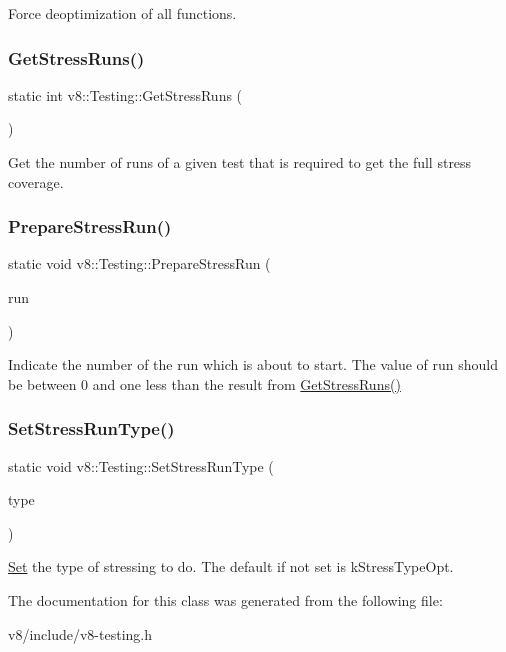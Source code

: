 Force deoptimization of all functions. \mbox{\label{classv8_1_1Testing_adc876063b1e07462b8d9544dd8efab36}} 
\subsubsection{\texorpdfstring{Get\+Stress\+Runs()}{GetStressRuns()}}
{\footnotesize\ttfamily static int v8\+::\+Testing\+::\+Get\+Stress\+Runs (\begin{DoxyParamCaption}{ }\end{DoxyParamCaption})\hspace{0.3cm}{\ttfamily [static]}}

Get the number of runs of a given test that is required to get the full stress coverage. \mbox{\label{classv8_1_1Testing_ab9da044b18b9d05770b655bed27ed7f4}} 
\subsubsection{\texorpdfstring{Prepare\+Stress\+Run()}{PrepareStressRun()}}
{\footnotesize\ttfamily static void v8\+::\+Testing\+::\+Prepare\+Stress\+Run (\begin{DoxyParamCaption}\item[{int}]{run }\end{DoxyParamCaption})\hspace{0.3cm}{\ttfamily [static]}}

Indicate the number of the run which is about to start. The value of run should be between 0 and one less than the result from \mbox{\hyperlink{classv8_1_1Testing_adc876063b1e07462b8d9544dd8efab36}{Get\+Stress\+Runs()}} \mbox{\label{classv8_1_1Testing_aafa5a4917998aa64134aa750ce5c4b2e}} 
\subsubsection{\texorpdfstring{Set\+Stress\+Run\+Type()}{SetStressRunType()}}
{\footnotesize\ttfamily static void v8\+::\+Testing\+::\+Set\+Stress\+Run\+Type (\begin{DoxyParamCaption}\item[{Stress\+Type}]{type }\end{DoxyParamCaption})\hspace{0.3cm}{\ttfamily [static]}}

\mbox{\hyperlink{classv8_1_1Set}{Set}} the type of stressing to do. The default if not set is k\+Stress\+Type\+Opt. 

The documentation for this class was generated from the following file\+:\begin{DoxyCompactItemize}
\item 
v8/include/v8-\/testing.\+h\end{DoxyCompactItemize}
